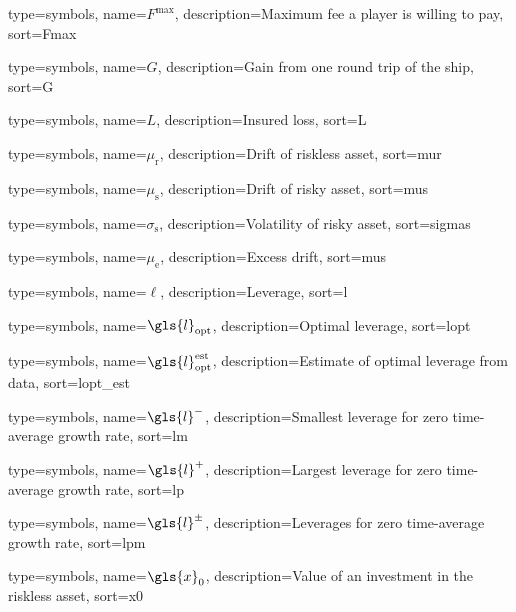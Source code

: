 {
  type={symbols}, 
  name={\ensuremath{F^{\text{max}}}},
  description={Maximum fee a player is willing to pay},
  sort=Fmax
}


{
  type={symbols}, 
  name={\ensuremath{G}},
  description={Gain from one round trip of the ship},
  sort=G
}

{
  type={symbols}, 
  name={\ensuremath{L}},
  description={Insured loss},
  sort=L
}


{
  type={symbols}, 
  name={\ensuremath{\mu_\text{r}}},
  description={Drift of riskless asset},
  sort=mur
}

{
  type={symbols}, 
  name={\ensuremath{\mu_\text{s}}},
  description={Drift of risky asset},
  sort=mus
}

{
  type={symbols}, 
  name={\ensuremath{\sigma_\text{s}}},
  description={Volatility of risky asset},
  sort=sigmas
}

{
  type={symbols}, 
  name={\ensuremath{\mu_\text{e}}},
  description={Excess drift},
  sort=mus
}

{
  type={symbols}, 
  name={\ensuremath{\ell}},
  description={Leverage},
  sort=l
}

{
  type={symbols}, 
  name={\ensuremath{\gls{l}_\text{opt}}},
  description={Optimal leverage},
  sort=lopt
}

{
  type={symbols}, 
  name={\ensuremath{\gls{l}_\text{opt}^\text{est}}},
  description={Estimate of optimal leverage from data},
  sort=lopt_est
}

{
  type={symbols}, 
  name={\ensuremath{\gls{l}^{-}}},
  description={Smallest leverage for zero time-average growth rate},
  sort=lm
}

{
  type={symbols}, 
  name={\ensuremath{\gls{l}^{+}}},
  description={Largest leverage for zero time-average growth rate},
  sort=lp
}

{
  type={symbols}, 
  name={\ensuremath{\gls{l}^{\pm}}},
  description={Leverages for zero time-average growth rate},
  sort=lpm
}

{
  type={symbols}, 
  name={\ensuremath{\gls{x}_0}},
  description={Value of an investment in the riskless asset},
  sort=x0
}

